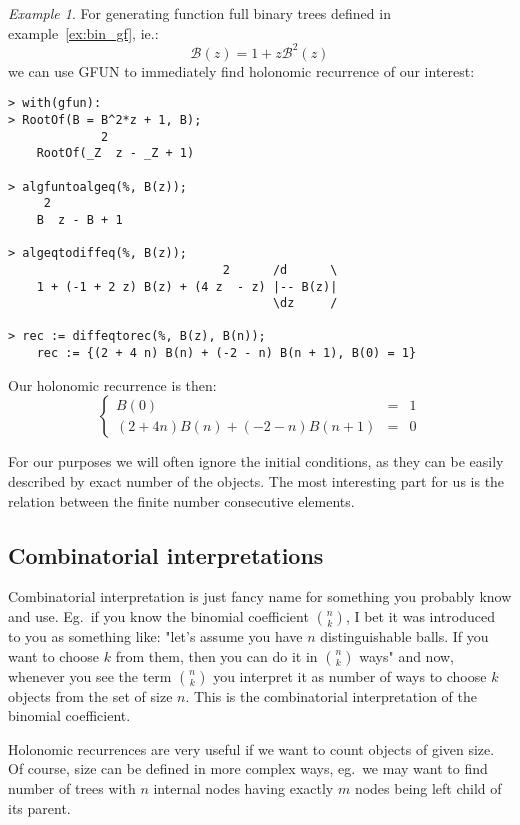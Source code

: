 \documentclass[final]{article}
\theoremstyle{definition}
\theoremstyle{remark}
\newtheorem{example}{Example}[subsection]
\newcommand{\gf}[1]{\ensuremath{\mathcal{#1}}}
\begin{document}
\begin{example}
    \label{ex:gfun-rec}
    For generating function full binary trees defined in example\ \ref{ex:bin_gf}, ie.:
    \[\gf{B}(z) = 1 + z\gf{B}^2(z)\]
    we can use GFUN\cite{gfun} to immediately find holonomic recurrence of our interest:

    \begin{lstlisting}
> with(gfun):
> RootOf(B = B^2*z + 1, B);
             2
    RootOf(_Z  z - _Z + 1)

> algfuntoalgeq(%, B(z));
     2
    B  z - B + 1

> algeqtodiffeq(%, B(z));
                              2      /d      \
    1 + (-1 + 2 z) B(z) + (4 z  - z) |-- B(z)|
                                     \dz     /

> rec := diffeqtorec(%, B(z), B(n));
    rec := {(2 + 4 n) B(n) + (-2 - n) B(n + 1), B(0) = 1}
    \end{lstlisting}

    Our holonomic recurrence is then:
    \[\left\{\begin{array}{rcl}
                B(0) &=& 1\\
                (2 + 4 n) B(n) + (-2 - n) B(n + 1) &=& 0
    \end{array}\right.\]

    For our purposes we will often ignore the initial conditions, as they can be easily described by exact number of the objects. The most interesting part for us is the relation between the finite number consecutive elements.

\end{example}

\subsection{Combinatorial interpretations}%
\label{sub:combinatorial_interpretations}

Combinatorial interpretation is just fancy name for something you probably know and use. Eg.\ if you know the binomial coefficient \(\binom{n}{k}\), I bet it was introduced to you as something like: "let's assume you have \(n\) distinguishable balls. If you want to choose \(k\) from them, then you can do it in \(\binom{n}{k}\) ways" and now, whenever you see the term \(\binom{n}{k}\) you interpret it as number of ways to choose \(k\) objects from the set of size \(n\). This is the combinatorial interpretation of the binomial coefficient.

Holonomic recurrences are very useful if we want to count objects of given size. Of course, size can be defined in more complex ways, eg.\ we may want to find number of trees with \(n\) internal nodes having exactly \(m\) nodes being left child of its parent.
\end{document}

